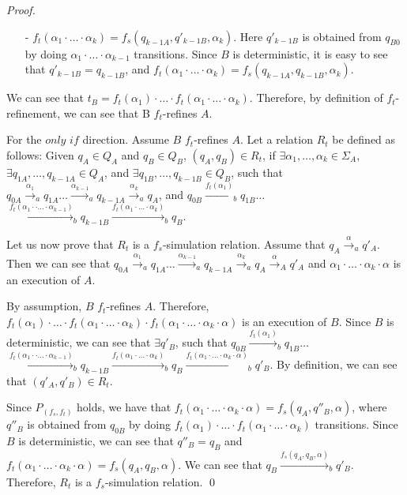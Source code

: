 \begin {proof}
\begin{itemize}
$\ldots$

\item[-] $f_t(\alpha_1 \cdot \ldots \cdot \alpha_k) = f_s(q_{k-1A},q'_{k-1B},\alpha_k)$. Here $q'_{k-1B}$ is obtained from $q_{B0}$ by doing $\alpha_1 \cdot \ldots \cdot \alpha_{k-1}$ transitions. Since $B$ is deterministic, it is easy to see that $q'_{k-1B} = q_{k-1B}$, and $f_t(\alpha_1 \cdot \ldots \cdot \alpha_k) = f_s(q_{k-1A},q_{k-1B},\alpha_k)$.
\end{itemize}

We can see that $t_B = f_t(\alpha_1) \cdot \ldots \cdot f_t(\alpha_1 \cdot \ldots \cdot \alpha_k)$. Therefore, by definition of $f_t$-refinement, we can see that B $f_t$-refines $A$.


For the $\textit{only if}$ direction. Assume $B$ $f_t$-refines $A$. Let a relation $R_t$ be defined as follows: Given $q_A \in Q_A$ and $q_B \in Q_B$, $(q_A,q_B) \in R_t$, if $\exists \alpha_1, \ldots, \alpha_k \in \Sigma_A$, $\exists q_{1A},\ldots,q_{k-1A} \in Q_A$, and $\exists q_{1B},\ldots,q_{k-1B} \in Q_B$, such that $q_{0A} {\xrightarrow{\alpha_1}}_a q_{1A} \ldots {\xrightarrow{\alpha_{k-1}}}_a q_{k-1A} {\xrightarrow{\alpha_k}}_a q_A$, and $q_{0B} {\xrightarrow{f_t(\alpha_1)}}_b q_{1B} \ldots$ ${\xrightarrow{f_t(\alpha_1 \cdot \cdot \ldots \cdot \alpha_{k-1})}}_b q_{k-1B} {\xrightarrow{f_t(\alpha_1 \cdot \ldots \cdot \alpha_k)}}_b q_B$.

Let us now prove that $R_t$ is a $f_s$-simulation relation. Assume that $q_A {\xrightarrow{\alpha}}_a q'_A$. Then we can see that $q_{0A} {\xrightarrow{\alpha_1}}_a q_{1A} \ldots {\xrightarrow{\alpha_{k-1}}}_a q_{k-1A} {\xrightarrow{\alpha_k}}_a q_A {\xrightarrow{\alpha}}_A q'_A$ and $\alpha_1 \cdot \ldots \cdot \alpha_k \cdot \alpha$ is an execution of $A$.

By assumption, $B$ $f_t$-refines $A$. Therefore, $f_t(\alpha_1) \cdot \ldots \cdot f_t(\alpha_1 \cdot \ldots \cdot \alpha_k) \cdot f_t(\alpha_1 \cdot \ldots \cdot \alpha_k \cdot \alpha)$ is an execution of $B$. Since $B$ is deterministic, we can see that $\exists q'_B$, such that $q_{0B} {\xrightarrow{f_t(\alpha_1)}}_b q_{1B} \ldots$ ${\xrightarrow{f_t(\alpha_1 \cdot \cdot \ldots \cdot \alpha_{k-1})}}_b q_{k-1B} {\xrightarrow{f_t(\alpha_1 \cdot \ldots \cdot \alpha_k)}}_b q_B {\xrightarrow{f_t(\alpha_1 \cdot \ldots \cdot \alpha_k \cdot \alpha)}}_b q'_B$. By definition, we can see that $(q'_A,q'_B) \in R_t$.

Since $P_{(f_s,f_t)}$ holds, we have that $f_t(\alpha_1 \cdot \ldots \cdot \alpha_k \cdot \alpha) = f_s(q_A,q''_B,\alpha)$, where $q''_B$ is obtained from $q_{0B}$ by doing $f_t(\alpha_1) \cdot \ldots \cdot f_t(\alpha_1 \cdot \ldots \cdot \alpha_k)$ transitions. Since $B$ is deterministic, we can see that $q''_B = q_B$ and $f_t(\alpha_1 \cdot \ldots \cdot \alpha_k \cdot \alpha) = f_s(q_A,q_B,\alpha)$. We can see that $q_B {\xrightarrow{f_s(q_A,q_B,\alpha)}}_b q'_B$. Therefore, $R_t$ is a $f_s$-simulation relation. \qed
\end {proof}

